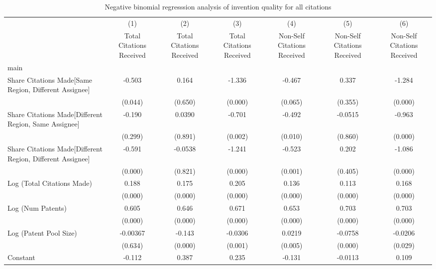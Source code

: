 \begin{table}[htbp]\centering \caption{Negative binomial regresssion analysis of invention quality for all citations \label{a.e.o.t.n.model123192021}} \begin{tabular}{l*{6}{c}} \hline\hline
                &\multicolumn{1}{c}{(1)}&\multicolumn{1}{c}{(2)}&\multicolumn{1}{c}{(3)}&\multicolumn{1}{c}{(4)}&\multicolumn{1}{c}{(5)}&\multicolumn{1}{c}{(6)}\\
                &\multicolumn{1}{c}{Total Citations Received}&\multicolumn{1}{c}{Total Citations Received}&\multicolumn{1}{c}{Total Citations Received}&\multicolumn{1}{c}{Non-Self Citations Received}&\multicolumn{1}{c}{Non-Self Citations Received}&\multicolumn{1}{c}{Non-Self Citations Received}\\
\hline
main            &         &         &         &         &         &         \\
Share Citations Made[Same Region, Different Assignee]&   -0.503&    0.164&   -1.336&   -0.467&    0.337&   -1.284\\
                &  (0.044)&  (0.650)&  (0.000)&  (0.065)&  (0.355)&  (0.000)\\
Share Citations Made[Different Region, Same Assignee]&   -0.190&   0.0390&   -0.701&   -0.492&  -0.0515&   -0.963\\
                &  (0.299)&  (0.891)&  (0.002)&  (0.010)&  (0.860)&  (0.000)\\
Share Citations Made[Different Region, Different Assignee]&   -0.591&  -0.0538&   -1.241&   -0.523&    0.202&   -1.086\\
                &  (0.000)&  (0.821)&  (0.000)&  (0.001)&  (0.405)&  (0.000)\\
Log (Total Citations Made)&    0.188&    0.175&    0.205&    0.136&    0.113&    0.168\\
                &  (0.000)&  (0.000)&  (0.000)&  (0.000)&  (0.000)&  (0.000)\\
Log (Num Patents)&    0.605&    0.646&    0.671&    0.653&    0.703&    0.703\\
                &  (0.000)&  (0.000)&  (0.000)&  (0.000)&  (0.000)&  (0.000)\\
Log (Patent Pool Size)& -0.00367&   -0.143&  -0.0306&   0.0219&  -0.0758&  -0.0206\\
                &  (0.634)&  (0.000)&  (0.001)&  (0.005)&  (0.000)&  (0.029)\\
Constant        &   -0.112&    0.387&    0.235&   -0.131&  -0.0113&    0.109\\

\end{tabular}
\end{table}
